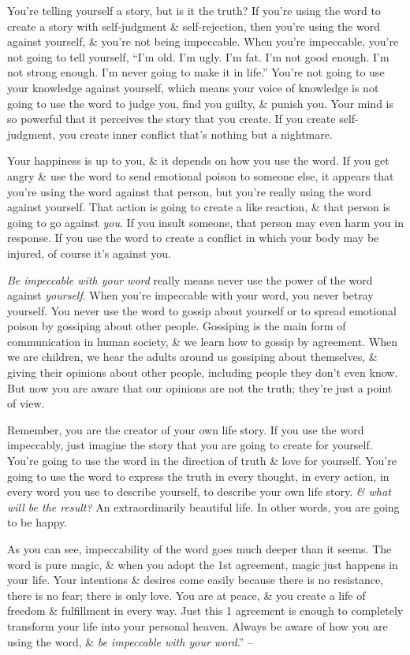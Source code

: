 \documentclass{article}
\numberwithin{equation}{section}
\begin{document}
You're telling yourself a story, but is it the truth? If you're using the word to create a story with self-judgment \& self-rejection, then you're using the word against yourself, \& you're not being impeccable. When you're impeccable, you're not going to tell yourself, ``I'm old. I'm ugly. I'm fat. I'm not good enough. I'm not strong enough. I'm never going to make it in life.'' You're not going to use your knowledge against yourself, which means your voice of knowledge is not going to use the word to judge you, find you guilty, \& punish you. Your mind is so powerful that it perceives the story that you create. If you create self-judgment, you create inner conflict that's nothing but a nightmare.

Your happiness is up to you, \& it depends on how you use the word. If you get angry \& use the word to send emotional poison to someone else, it appears that you're using the word against that person, but you're really using the word against yourself. That action is going to create a like reaction, \& that person is going to go against \textit{you}. If you insult someone, that person may even harm you in response. If you use the word to create a conflict in which your body may be injured, of course it's against you.

\textit{Be impeccable with your word} really means never use the power of the word against \textit{yourself}. When you're impeccable with your word, you never betray yourself. You never use the word to gossip about yourself or to spread emotional poison by gossiping about other people. Gossiping is the main form of communication in human society, \& we learn how to gossip by agreement. When we are children, we hear the adults around us gossiping about themselves, \& giving their opinions about other people, including people they don't even know. But now you are aware that our opinions are not the truth; they're just a point of view.

Remember, you are the creator of your own life story. If you use the word impeccably, just imagine the story that you are going to create for yourself. You're going to use the word in the direction of truth \& love for yourself. You're going to use the word to express the truth in every thought, in every action, in every word you use to describe yourself, to describe your own life story. \textit{\& what will be the result?} An extraordinarily beautiful life. In other words, you are going to be happy.

As you can see, impeccability of the word goes much deeper than it seems. The word is pure magic, \& when you adopt the 1st agreement, magic just happens in your life. Your intentions \& desires come easily because there is no resistance, there is no fear; there is only love. You are at peace, \& you create a life of freedom \& fulfillment in every way. Just this 1 agreement is enough to completely transform your life into your personal heaven. Always be aware of how you are using the word, \& \textit{be impeccable with your word}.'' -- \cite[pp. 37--40]{Ruiz_Ruiz2011}
\end{document}

